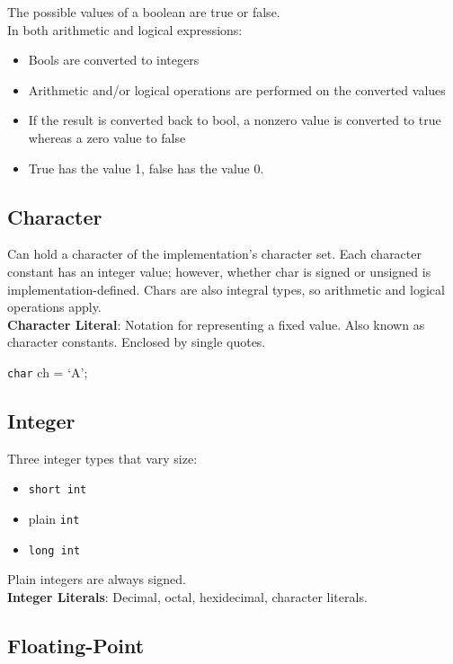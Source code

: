 \documentclass{article}
\begin{document}
	The possible values of a boolean are true or false.\\
	
	In both arithmetic and logical expressions:
	\begin{itemize}
		\item Bools are converted to integers
		\item Arithmetic and/or logical operations are performed on the converted values
		\item If the result is converted back to bool, a nonzero value is converted to true whereas a zero value to false
		\item True has the value 1, false has the value 0.
	\end{itemize}

	\subsection{Character}
	
	Can hold a character of the implementation's character set. Each character constant has an integer value; however, whether char is signed or unsigned is implementation-defined. Chars are also integral types, so arithmetic and logical operations apply.\\
	
	\textbf{Character Literal}: Notation for representing a fixed value. Also known as character constants. Enclosed by single quotes.
	
	\begin{center}
		\verb|char| ch = `A';
	\end{center}
	
	\subsection{Integer}
	
	Three integer types that vary size:
	\begin{itemize}
		\item \verb|short int|
		\item plain \verb|int|
		\item \verb|long int|
	\end{itemize}
	
	Plain integers are always signed. \\
	
	\textbf{Integer Literals}: Decimal, octal, hexidecimal, character literals.
	
	\subsection{Floating-Point}
	
\end{document}
